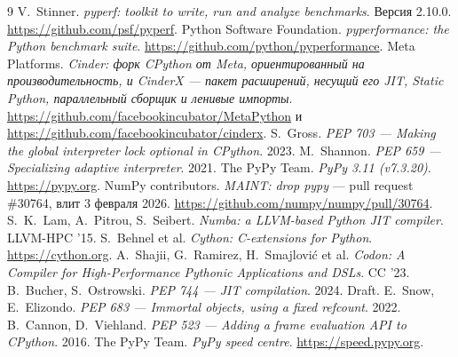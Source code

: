 \documentclass[10pt,a4paper]{article}
\begin{document}
\begin{thebibliography}{9}
\small
{} V.~Stinner. \emph{pyperf: toolkit to write, run and analyze benchmarks}.
  Версия 2.10.0. \url{https://github.com/psf/pyperf}.
 Python Software Foundation. \emph{pyperformance: the Python
  benchmark suite}. \url{https://github.com/python/pyperformance}.
 Meta Platforms. \emph{Cinder: форк CPython от Meta, ориентированный на
  производительность, и CinderX --- пакет расширений, несущий его JIT, Static Python,
  параллельный сборщик и ленивые импорты}.
  \url{https://github.com/facebookincubator/MetaPython} и
  \url{https://github.com/facebookincubator/cinderx}.
 S.~Gross. \emph{PEP 703 --- Making the global interpreter lock optional in
  CPython}. 2023.
 M.~Shannon. \emph{PEP 659 --- Specializing adaptive interpreter}. 2021.
 The PyPy Team. \emph{PyPy 3.11 (v7.3.20)}. \url{https://pypy.org}.
 NumPy contributors. \emph{MAINT: drop pypy} --- pull request \#30764,
  влит 3 февраля 2026. \url{https://github.com/numpy/numpy/pull/30764}.
 S.~K.~Lam, A.~Pitrou, S.~Seibert. \emph{Numba: a LLVM-based Python JIT
  compiler}. LLVM-HPC '15.
 S.~Behnel et al. \emph{Cython: C-extensions for Python}.
  \url{https://cython.org}.
 A.~Shajii, G.~Ramirez, H.~Smajlovi\'c et al. \emph{Codon: A Compiler for
  High-Performance Pythonic Applications and DSLs}. CC '23.
 B.~Bucher, S.~Ostrowski. \emph{PEP 744 --- JIT compilation}. 2024.
  Draft.
 E.~Snow, E.~Elizondo. \emph{PEP 683 --- Immortal objects, using a fixed
  refcount}. 2022.
 B.~Cannon, D.~Viehland. \emph{PEP 523 --- Adding a frame
  evaluation API to CPython}. 2016.
 The PyPy Team. \emph{PyPy speed centre}. \url{https://speed.pypy.org}.
\end{thebibliography}
\end{document}

